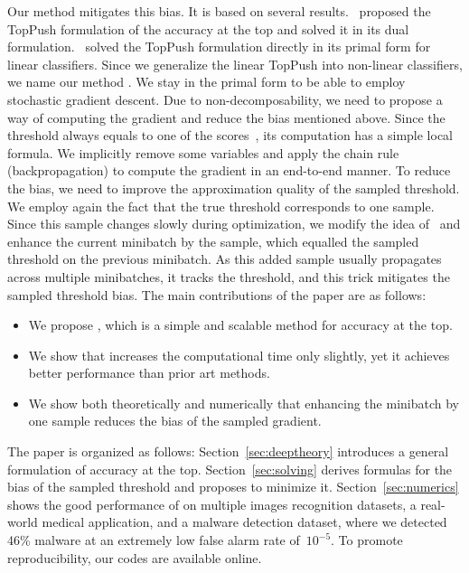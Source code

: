 Our method mitigates this bias. It is based on several results.~\cite{li2014top} proposed the TopPush formulation of the accuracy at the top and solved it in its dual formulation.~\cite{adam2019patmat} solved the TopPush formulation directly in its primal form for linear classifiers. Since we generalize the linear TopPush into non-linear classifiers, we name our method \DeepTopPush. We stay in the primal form to be able to employ stochastic gradient descent. Due to non-decomposability, we need to propose a way of computing the gradient and reduce the bias mentioned above. Since the threshold always equals to one of the scores~\cite{boyd2012accuracy}, its computation has a simple local formula. We implicitly remove some variables and apply the chain rule (backpropagation) to compute the gradient in an end-to-end manner. To reduce the bias, we need to improve the approximation quality of the sampled threshold. We employ again the fact that the true threshold corresponds to one sample. Since this sample changes slowly during optimization, we modify the idea of~\cite{adam2019machine} and enhance the current minibatch by the sample, which equalled the sampled threshold on the previous minibatch. As this added sample usually propagates across multiple minibatches, it tracks the threshold, and this trick mitigates the sampled threshold bias. The main contributions of the paper are as follows:
\begin{itemize}
  \item We propose \DeepTopPush, which is a simple and scalable method for accuracy at the top.
  \item We show that \DeepTopPush increases the computational time only slightly, yet it achieves better performance than prior art methods.
  \item We show both theoretically and numerically that enhancing the minibatch by one sample reduces the bias of the sampled gradient.
\end{itemize}
The paper is organized as follows: Section~\ref{sec:deeptheory} introduces a general formulation of accuracy at the top. Section~\ref{sec:solving} derives formulas for the bias of the sampled threshold and proposes \DeepTopPush to minimize it. Section~\ref{sec:numerics} shows the good performance of \DeepTopPush on multiple images recognition datasets, a real-world medical application, and a malware detection dataset, where we detected 46\% malware at an extremely low false alarm rate of~$10^{-5}$. To promote reproducibility, our codes are available online.

